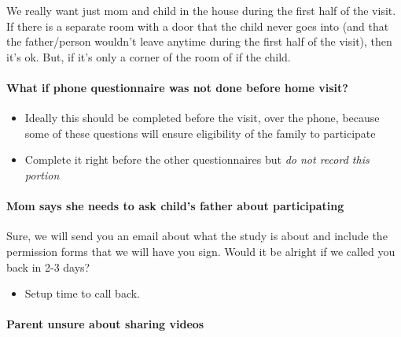 \documentclass[
  12pt,
]{book}
\providecommand{\tightlist}{%
  \setlength{\itemsep}{0pt}\setlength{\parskip}{0pt}}
\begin{document}
We really want just mom and child in the house during the first half of the visit. If there is a separate room with a door that the child never goes into (and that the father/person wouldn't leave anytime during the first half of the visit), then it's ok. But, if it's only a corner of the room of if the child.

\hypertarget{what-if-phone-questionnaire-was-not-done-before-home-visit}{%
\paragraph*{What if phone questionnaire was not done before home visit?}\label{what-if-phone-questionnaire-was-not-done-before-home-visit}}

\begin{itemize}
\tightlist
\item
  Ideally this should be completed before the visit, over the phone, because some of these questions will ensure eligibility of the family to participate\\
\item
  Complete it right before the other questionnaires but \emph{do not record this portion}
\end{itemize}

\hypertarget{mom-says-she-needs-to-ask-childs-father-about-participating}{%
\paragraph*{Mom says she needs to ask child's father about participating}\label{mom-says-she-needs-to-ask-childs-father-about-participating}}

Sure, we will send you an email about what the study is about and include the permission forms that we will have you sign. Would it be alright if we called you back in 2-3 days?

\begin{itemize}
\tightlist
\item
  Setup time to call back.
\end{itemize}

\hypertarget{parent-unsure-about-sharing-videos}{%
\paragraph*{Parent unsure about sharing videos}\label{parent-unsure-about-sharing-videos}}
\end{document}
